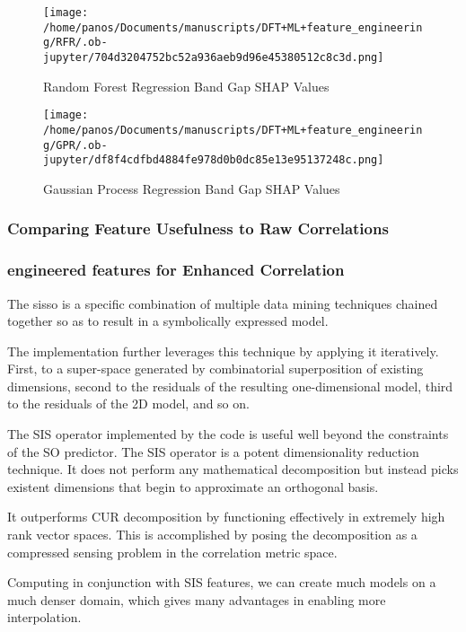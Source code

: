 \documentclass[aip, jmp, amsmath, amssymb]{revtex4-2}
\begin{document}
\begin{figure}[htbp]
\centering
\texttt{[image: /home/panos/Documents/manuscripts/DFT+ML+feature\_engineering/RFR/.ob-jupyter/704d3204752bc52a936aeb9d96e45380512c8c3d.png]}
\caption{Random Forest Regression Band Gap SHAP Values}
\end{figure}

\begin{figure}[htbp]
\centering
\texttt{[image: /home/panos/Documents/manuscripts/DFT+ML+feature\_engineering/GPR/.ob-jupyter/df8f4cdfbd4884fe978d0b0dc85e13e95137248c.png]}
\caption{Gaussian Process Regression Band Gap SHAP Values}
\end{figure}

\subsubsection*{Comparing Feature Usefulness to Raw Correlations}
\label{sec:orgbe9f644}

\subsubsection*{engineered features for Enhanced Correlation}
\label{sec:org520bbad}
The \Acrfull{sisso}
\cite{ouyang-2018-sisso,ghiringhelli-2017-learn-physic} is a specific combination of
multiple data mining techniques chained together so as to result in a
symbolically expressed model.

The implementation further leverages this technique by applying it
iteratively. First, to a super-space generated by combinatorial
superposition of existing dimensions, second to the residuals of the
resulting one-dimensional model, third to the residuals of the 2D
model, and so on.

The SIS operator implemented by the  code\cite{ouyang-2018-sisso}
is useful well beyond the constraints of the SO predictor. The SIS
operator is a potent dimensionality reduction technique. It does not
perform any mathematical decomposition but instead picks existent
dimensions that begin to approximate an orthogonal basis. 

It outperforms CUR\cite{ray-2021-various-dimen,hamm-2019-cur-decom}
decomposition by functioning effectively in extremely high rank vector
spaces. This is accomplished by posing the decomposition as a
compressed sensing problem in the correlation metric space. 

Computing  in conjunction with SIS features, we can create much
models on a much denser domain, which gives many advantages in
enabling more interpolation.
\end{document}
